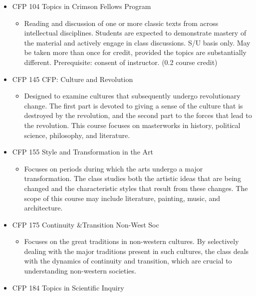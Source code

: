 \documentclass[
  letterpaper,
]{scrbook}
\providecommand{\tightlist}{%
  \setlength{\itemsep}{0pt}\setlength{\parskip}{0pt}}
\begin{document}
\begin{itemize}
\tightlist
\item
  CFP 104 Topics in Crimson Fellows Program

  \begin{itemize}
  \tightlist
  \item
    Reading and discussion of one or more classic texts from across
    intellectual disciplines. Students are expected to demonstrate
    mastery of the material and actively engage in class discussions.
    S/U basis only. May be taken more than once for credit, provided the
    topics are substantially different. Prerequisite: consent of
    instructor. (0.2 course credit)
  \end{itemize}
\item
  CFP 145 CFP: Culture and Revolution

  \begin{itemize}
  \tightlist
  \item
    Designed to examine cultures that subsequently undergo revolutionary
    change. The first part is devoted to giving a sense of the culture
    that is destroyed by the revolution, and the second part to the
    forces that lead to the revolution. This course focuses on
    masterworks in history, political science, philosophy, and
    literature.
  \end{itemize}
\item
  CFP 155 Style and Transformation in the Art

  \begin{itemize}
  \tightlist
  \item
    Focuses on periods during which the arts undergo a major
    transformation. The class studies both the artistic ideas that are
    being changed and the characteristic styles that result from these
    changes. The scope of this course may include literature, painting,
    music, and architecture.
  \end{itemize}
\item
  CFP 175 Continuity \&Transition Non-West Soc

  \begin{itemize}
  \tightlist
  \item
    Focuses on the great traditions in non-western cultures. By
    selectively dealing with the major traditions present in such
    cultures, the class deals with the dynamics of continuity and
    transition, which are crucial to understanding non-western
    societies.
  \end{itemize}
\item
  CFP 184 Topics in Scientific Inquiry


\end{itemize}
\end{document}
